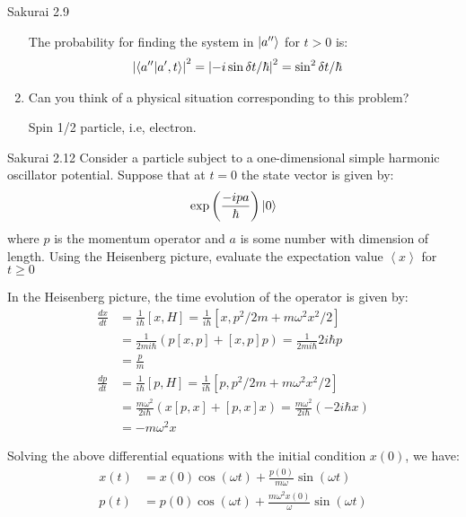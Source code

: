 \documentclass{article}
\newcommand{\expc}[1]{\left<#1\right>}
\begin{document}
\begin{section}{Sakurai 2.9}
\begin{enumerate}
	\begin{tcolorbox}
		The probability for finding the system in $\ket{a''}$ for $t > 0$ is:
		\begin{align*}
			\abs{\bra{a''}\ket{a', t}}^2 & = \abs{-i \sin \delta t/\hbar}^2 = \sin^2 \delta t/\hbar
		\end{align*}
	\end{tcolorbox}

	\item Can you think of a physical situation corresponding to this problem?
	\begin{tcolorbox}
		Spin 1/2 particle, i.e, electron.
	\end{tcolorbox}
\end{enumerate}
\end{section}

\newpage
\begin{section}{Sakurai 2.12}
Consider a particle subject to a one-dimensional simple harmonic oscillator potential. Suppose that at $t=0$ the state vector is given by:
$$
	\exp \left( \frac{-ipa}{\hbar} \right) \ket{0}
$$
where $p$ is the momentum operator and $a$ is some number with dimension of length. Using the Heisenberg picture, evaluate the expectation value $\expc{x}$ for $t \geq 0$

\begin{tcolorbox}
	In the Heisenberg picture, the time evolution of the operator is given by:
	\begin{align*}
		\frac{dx}{dt}
		 & = \frac{1}{i\hbar}[x, H] = \frac{1}{i\hbar} [x, p^2/2m + m\omega^2x^2/2]               \\
		 & = \frac{1}{2mi\hbar} (p[x,p] + [x,p]p) = \frac{1}{2mi\hbar} 2i\hbar p                  \\
		 & = \frac{p}{m}                                                                          \\
		\frac{dp}{dt}
		 & = \frac{1}{i\hbar}[p, H] = \frac{1}{i\hbar} [p, p^2/2m + m\omega^2x^2/2]               \\
		 & = \frac{m\omega^2}{2i\hbar} (x[p,x] + [p,x]x) = \frac{m\omega^2}{2i\hbar} (-2i\hbar x) \\
		 & = -m\omega^2x
	\end{align*}

	Solving the above differential equations with the initial condition $x(0)$, we have:
	\begin{align*}
		x(t) & = x(0) \cos (\omega t) + \frac{p(0)}{m \omega} \sin (\omega t)          \\
		p(t) & = p(0) \cos (\omega t) + \frac{m \omega^2 x(0)}{\omega} \sin (\omega t)
	\end{align*}


\end{tcolorbox}
\end{section}
\end{document}

